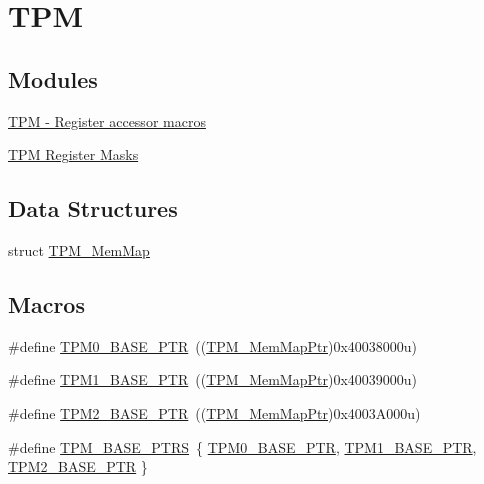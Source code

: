 \hypertarget{group___t_p_m___peripheral}{}\section{T\+PM}
\label{group___t_p_m___peripheral}
\subsection*{Modules}
\begin{DoxyCompactItemize}
\item 
\hyperlink{group___t_p_m___register___accessor___macros}{T\+P\+M -\/ Register accessor macros}
\item 
\hyperlink{group___t_p_m___register___masks}{T\+P\+M Register Masks}
\end{DoxyCompactItemize}
\subsection*{Data Structures}
\begin{DoxyCompactItemize}
\item 
struct \hyperlink{struct_t_p_m___mem_map}{T\+P\+M\+\_\+\+Mem\+Map}
\end{DoxyCompactItemize}
\subsection*{Macros}
\begin{DoxyCompactItemize}
\item 
\#define \hyperlink{group___t_p_m___peripheral_ga8ba6c6fb69345639750108c3289a24c4}{T\+P\+M0\+\_\+\+B\+A\+S\+E\+\_\+\+P\+TR}~((\hyperlink{group___t_p_m___peripheral_ga32147338cedc9904efff0d19b3a358ac}{T\+P\+M\+\_\+\+Mem\+Map\+Ptr})0x40038000u)
\item 
\#define \hyperlink{group___t_p_m___peripheral_ga3c3f533f8c87c74f2bbc3a4de83d1181}{T\+P\+M1\+\_\+\+B\+A\+S\+E\+\_\+\+P\+TR}~((\hyperlink{group___t_p_m___peripheral_ga32147338cedc9904efff0d19b3a358ac}{T\+P\+M\+\_\+\+Mem\+Map\+Ptr})0x40039000u)
\item 
\#define \hyperlink{group___t_p_m___peripheral_ga37cc120e7475fb646fe9bc15b57f06bc}{T\+P\+M2\+\_\+\+B\+A\+S\+E\+\_\+\+P\+TR}~((\hyperlink{group___t_p_m___peripheral_ga32147338cedc9904efff0d19b3a358ac}{T\+P\+M\+\_\+\+Mem\+Map\+Ptr})0x4003\+A000u)
\item 
\#define \hyperlink{group___t_p_m___peripheral_ga1d61ed554c056d8f63d1dbcc7ce05e62}{T\+P\+M\+\_\+\+B\+A\+S\+E\+\_\+\+P\+T\+RS}~\{ \hyperlink{group___t_p_m___peripheral_ga8ba6c6fb69345639750108c3289a24c4}{T\+P\+M0\+\_\+\+B\+A\+S\+E\+\_\+\+P\+TR}, \hyperlink{group___t_p_m___peripheral_ga3c3f533f8c87c74f2bbc3a4de83d1181}{T\+P\+M1\+\_\+\+B\+A\+S\+E\+\_\+\+P\+TR}, \hyperlink{group___t_p_m___peripheral_ga37cc120e7475fb646fe9bc15b57f06bc}{T\+P\+M2\+\_\+\+B\+A\+S\+E\+\_\+\+P\+TR} \}
\end{DoxyCompactItemize}
